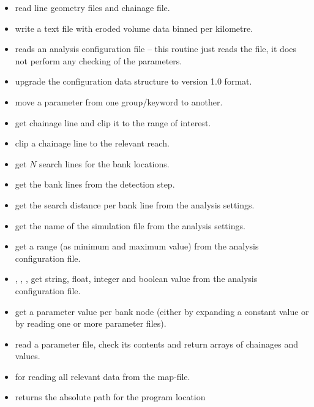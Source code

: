 \begin{itemize}
\item {} read line geometry files and chainage file.
\item {} write a text file with eroded volume data binned per kilometre.

\item {} reads an analysis configuration file -- this routine just reads the file, it does not perform any checking of the parameters.
\item {} upgrade the configuration data structure to version 1.0 format.
\item {} move a parameter from one group/keyword to another.

\item {} get chainage line and clip it to the range of interest.
\item {} clip a chainage line to the relevant reach.
\item {} get $N$ search lines for the bank locations.
\item {} get the bank lines from the detection step.
\item {} get the search distance per bank line from the analysis settings.
\item {} get the name of the simulation file from the analysis settings.
\item {} get a range (as minimum and maximum value) from the analysis configuration file.
\item {}, , ,  get string, float, integer and boolean value from the analysis configuration file.
\item {} get a parameter value per bank node (either by expanding a constant value or by reading one or more parameter files).
\item {} read a parameter file, check its contents and return arrays of chainages and values.
\item {} for reading all relevant data from the \dflowfm map-file.
\item {} returns the absolute path for the program location
\end{itemize}


